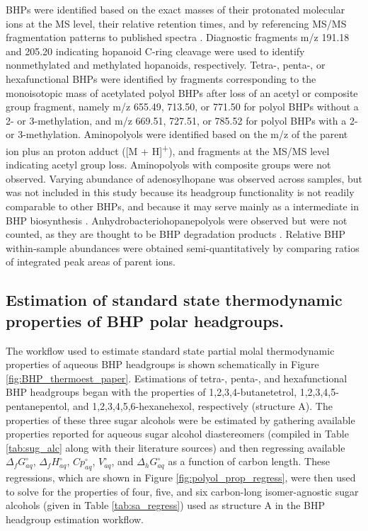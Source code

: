 BHPs were identified based on the exact masses of their protonated molecular ions at the MS level, their relative retention times, and by referencing MS/MS fragmentation patterns to published spectra \citep{talbot2005bacteriohopanepolyols, talbot2007rapid, talbot2007structural, talbot2003atmospheric, talbot2003characteristic, talbot2008cyanobacterial}. Diagnostic fragments m/z 191.18 and 205.20 indicating hopanoid C-ring cleavage were used to identify nonmethylated and methylated hopanoids, respectively. Tetra-, penta-, or hexafunctional BHPs were identified by fragments corresponding to the monoisotopic mass of acetylated polyol BHPs after loss of an acetyl or composite group fragment, namely m/z 655.49, 713.50, or 771.50 for polyol BHPs without a 2- or 3-methylation, and m/z 669.51, 727.51, or 785.52 for polyol BHPs with a 2- or 3-methylation. Aminopolyols were identified based on the m/z of the parent ion plus an proton adduct ([M + H]\textsuperscript{+}), and fragments at the MS/MS level indicating acetyl group loss. Aminopolyols with composite groups were not observed. Varying abundance of adenosylhopane was observed across samples, but was not included in this study because its headgroup functionality is not readily comparable to other BHPs, and because it may serve mainly as a intermediate in BHP biosynthesis \citep{bradley2010adenosylhopane}. Anhydrobacteriohopanepolyols were observed but were not counted, as they are thought to be BHP degradation products \citep{talbot2005bacteriohopanepolyols, schaeffer2008acid}. Relative BHP within-sample abundances were obtained semi-quantitatively by comparing ratios of integrated peak areas of parent ions.



\subsection{Estimation of standard state thermodynamic properties of BHP polar headgroups.}
The workflow used to estimate standard state partial molal thermodynamic properties of aqueous BHP headgroups is shown schematically in Figure \ref{fig:BHP_thermoest_paper}. Estimations of tetra-, penta-, and hexafunctional BHP headgroups began with the properties of 1,2,3,4-butanetetrol, 1,2,3,4,5-pentanepentol, and 1,2,3,4,5,6-hexanehexol, respectively (structure A). The properties of these three sugar alcohols were be estimated by gathering available properties reported for aqueous sugar alcohol diastereomers (compiled in Table \ref{tab:sug_alc} along with their literature sources) and then regressing available $\Delta_{f}G^{\circ}_{aq}$, $\Delta_{f}H^{\circ}_{aq}$, $Cp^{\circ}_{aq}$, $V^{\circ}_{aq}$, and $\Delta_{h}G^{\circ}_{aq}$ as a function of carbon length. These regressions, which are shown in Figure \ref{fig:polyol_prop_regress}, were then used to solve for the properties of four, five, and six carbon-long isomer-agnostic sugar alcohols (given in Table \ref{tab:sa_regress}) used as structure A in the BHP headgroup estimation workflow.


